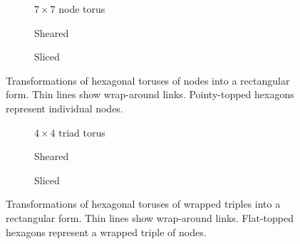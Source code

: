 			\begin{figure}
				\center
				\begin{subfigure}[b]{0.32\linewidth}
					\center
					
					\caption{$7 \times 7$ node torus}
					\label{fig:hex-to-plane-node-native}
				\end{subfigure}
				\begin{subfigure}[b]{0.32\linewidth}
					\center
					
					\caption{Sheared}
					\label{fig:hex-to-plane-node-shear}
				\end{subfigure}
				\begin{subfigure}[b]{0.32\linewidth}
					\center
					
					\caption{Sliced}
					\label{fig:hex-to-plane-node-slice}
				\end{subfigure}
				
				\caption{Transformations of hexagonal toruses of nodes into a
				rectangular form. Thin lines show wrap-around links. Pointy-topped
				hexagons represent individual nodes.}
				\label{fig:hex-to-plane-node}
			\end{figure}
			
			\begin{figure}
				
				\begin{subfigure}[b]{0.32\linewidth}
					\center
					
					\caption{$4 \times 4$ triad torus}
					\label{fig:hex-to-plane-native}
				\end{subfigure}
				\begin{subfigure}[b]{0.32\linewidth}
					\center
					
					\caption{Sheared}
					\label{fig:hex-to-plane-shear}
				\end{subfigure}
				\begin{subfigure}[b]{0.32\linewidth}
					\center
					
					\caption{Sliced}
					\label{fig:hex-to-plane-slice}
				\end{subfigure}
				
				\caption{Transformations of hexagonal toruses of wrapped triples into a
				rectangular form.  Thin lines show wrap-around links. Flat-topped
				hexagons represent a wrapped triple of nodes.}
				\label{fig:hex-to-plane}
			\end{figure}
			
